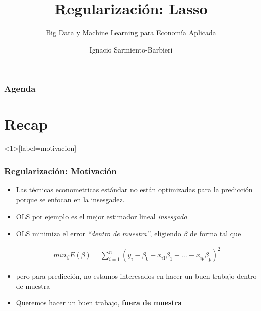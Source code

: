 \documentclass[
  shownotes,
  xcolor={svgnames},
  hyperref={colorlinks,citecolor=DarkBlue,linkcolor=andesred,urlcolor=DarkBlue}
  , aspectratio=169]{beamer}
\begin{document}
\title{Regularización: Lasso}
\subtitle{Big Data y Machine Learning para Economía Aplicada}
\date{}

\author[Sarmiento-Barbieri]{Ignacio Sarmiento-Barbieri}



\begin{frame}[noframenumbering]
\maketitle
\end{frame}
\begin{frame}
\frametitle{Agenda}

\tableofcontents


\end{frame}
\section{Recap}
\begin{frame}<1>[label=motivacion]
\frametitle{Regularización: Motivación}

\begin{itemize}
\item Las técnicas econometricas estándar no están optimizadas para la predicción porque se enfocan en la insesgadez.
\medskip
\item OLS por ejemplo es el mejor estimador lineal {\it insesgado}
\medskip
\item OLS minimiza el error {\it ``dentro de muestra''}, eligiendo $\beta$ de forma tal que 


\begin{align}
min_{\beta} E(\beta) = \sum_{i=1}^n (y_i-\beta_0 - x_{i1}\beta_1 - \dots - x_{ip}\beta_p)^2 
\end{align}

\item pero para predicción, no estamos interesados en hacer un buen trabajo dentro de muestra 
\medskip
\item Queremos hacer un buen trabajo, {\bf fuera de muestra}
\end{itemize}
\end{frame}
\end{document}
